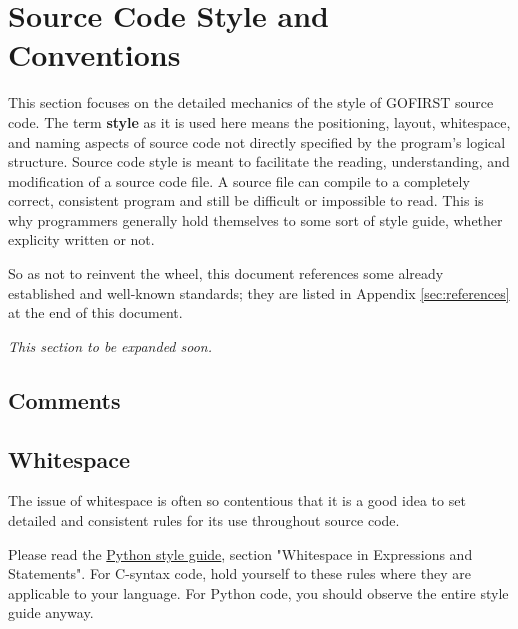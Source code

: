 \documentclass[12pt]{article}
\newcommand{\textdef}[1]{\textbf{#1}}
\begin{document}
\section{Source Code Style and Conventions}
\label{sec:codestyle}
This section focuses on the detailed mechanics of the style of GOFIRST source code. The term \textdef{style} as it is used here means the positioning, layout, whitespace, and naming aspects of source code not directly specified by the program's logical structure. Source code style is meant to facilitate the reading, understanding, and modification of a source code file. A source file can compile to a completely correct, consistent program and still be difficult or impossible to read. This is why programmers generally hold themselves to some sort of style guide, whether explicity written or not.

So as not to reinvent the wheel, this document references some already established and well-known standards; they are listed in Appendix \ref{sec:references} at the end of this document.

\textit{This section to be expanded soon.}

\subsection{Comments}

\subsection{Whitespace}
\label{sec:spacing}
The issue of whitespace is often so contentious that it is a good idea to set detailed and consistent rules for its use throughout source code.

Please read the \hyperref[pyguide]{Python style guide}, section "Whitespace in Expressions and Statements". For C-syntax code, hold yourself to these rules where they are applicable to your language. For Python code, you should observe the entire style guide anyway.
\end{document}
